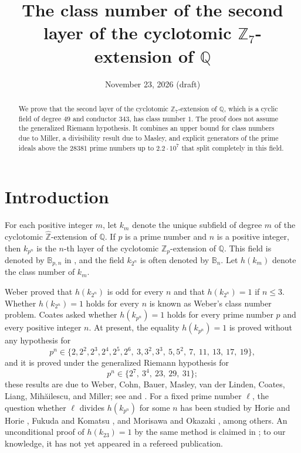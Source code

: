 \documentclass[11pt]{amsart}
\title[The second layer of the cyclotomic $\mathbb{Z}_7$-extension]{The class number of the second layer of the cyclotomic $\mathbb{Z}_7$-extension of $\mathbb{Q}$}
\date{November 23, 2026 (draft)}
\theoremstyle{plain}
\theoremstyle{definition}
\begin{document}
\begin{abstract}
We prove that the second layer of the cyclotomic $\mathbb{Z}_7$-extension of $\mathbb{Q}$, which is a cyclic field of degree $49$ and conductor $343$, has class number $1$.
The proof does not assume the generalized Riemann hypothesis.
It combines an upper bound for class numbers due to Miller, a divisibility result due to Masley, and explicit generators of the prime ideals above the $28381$ prime numbers up to $2.2 \cdot 10^{7}$ that split completely in this field.
\end{abstract}

\maketitle

\section{Introduction}

For each positive integer $m$, let $k_m$ denote the unique subfield of degree $m$ of the cyclotomic $\hat{\mathbb{Z}}$-extension of $\mathbb{Q}$.
If $p$ is a prime number and $n$ is a positive integer, then $k_{p^n}$ is the $n$-th layer of the cyclotomic $\mathbb{Z}_p$-extension of $\mathbb{Q}$.
This field is denoted by $\mathbb{B}_{p,n}$ in \cite{Mi15b}, and the field $k_{2^n}$ is often denoted by $\mathbb{B}_n$.
Let $h(k_m)$ denote the class number of $k_m$.

Weber \cite{We86} proved that $h(k_{2^n})$ is odd for every $n$ and that $h(k_{2^n}) = 1$ if $n \le 3$.
Whether $h(k_{2^n}) = 1$ holds for every $n$ is known as Weber's class number problem.
Coates \cite{Co12} asked whether $h(k_{p^n}) = 1$ holds for every prime number $p$ and every positive integer $n$.
At present, the equality $h(k_{p^n}) = 1$ is proved without any hypothesis for
\[
p^n \in \{2, 2^2, 2^3, 2^4, 2^5, 2^6,\ 3, 3^2, 3^3,\ 5, 5^2,\ 7,\ 11,\ 13,\ 17,\ 19\},
\]
and it is proved under the generalized Riemann hypothesis for
\[
p^n \in \{2^7,\ 3^4,\ 23,\ 29,\ 31\};
\]
these results are due to Weber, Cohn, Bauer, Masley, van der Linden, Coates, Liang, Mih\u{a}ilescu, and Miller; see \cite[Table 1, Theorem 7, and Table 2]{Mi15b} and \cite{Co60, Ba69, Ma78, vdL82, Co12, Mi14, Mi14b}.
For a fixed prime number $\ell$, the question whether $\ell$ divides $h(k_{p^n})$ for some $n$ has been studied by Horie and Horie \cite{HH09}, Fukuda and Komatsu \cite{FK11}, and Morisawa and Okazaki \cite{MO13}, among others.
An unconditional proof of $h(k_{23}) = 1$ by the same method is claimed in \cite{Ch26}; to our knowledge, it has not yet appeared in a refereed publication.
\end{document}
